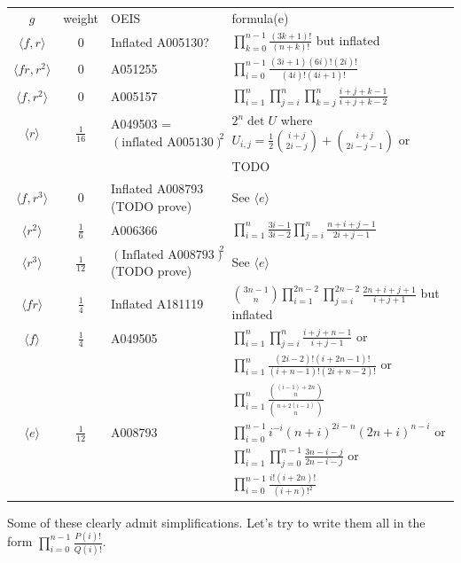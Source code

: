 \documentclass[11pt,a4paper]{article}
\theoremstyle{remark}
\begin{document}
\begin{tabular}{ccll}
$g$                     & weight & OEIS & formula(e) \\
$\langle f,r\rangle$    & $0$ & Inflated A005130? & $\prod_{k=0}^{n-1} \frac{(3k+1)!}{(n+k)!}$ but inflated \\
$\langle fr,r^2\rangle$ & $0$ & A051255 & $\prod_{i=0}^{n-1} \frac{(3i+1)(6i)!(2i)!}{(4i)!(4i+1)!}$ \\
$\langle f,r^2\rangle$  & $0$ & A005157 & $\prod_{i=1}^n \prod_{j=i}^n \prod_{k=j}^n \frac{i+j+k-1}{i+j+k-2}$ \\
$\langle r\rangle$      & $\frac{1}{16}$ & A049503 = $(\textrm{inflated A005130})^2$ & $2^n \det U$ where $U_{i,j} = \frac{1}{2}\binom{i+j}{2i-j} + \binom{i+j}{2i-j-1}$ or \\
	& & & TODO \\
$\langle f,r^3\rangle$  & $0$ & Inflated A008793 (TODO prove) & See $\langle e\rangle$ \\
$\langle r^2\rangle$    & $\frac{1}{6}$ & A006366 & $\prod_{i=1}^n \frac{3i-1}{3i-2} \prod_{j=i}^{n} \frac{n+i+j-1}{2i+j-1}$ \\
$\langle r^3\rangle$    & $\frac{1}{12}$ & $(\textrm{Inflated A008793})^2$ (TODO prove) & See $\langle e\rangle$ \\

$\langle fr\rangle$     & $\frac{1}{4}$ & Inflated A181119 & $\binom{3n-1}{n} \prod_{i=1}^{2n-2} \prod_{j=i}^{2n-2} \frac{2n+i+j+1}{i+j+1}$ but inflated \\

$\langle f\rangle$      & $\frac{1}{4}$ & A049505 & $\prod_{i=1}^n \prod_{j=i}^n \frac{i+j+n-1}{i+j-1}$ or \\
	& & & $\prod_{i=1}^n \frac{ (2i-2)!(i+2n-1)! }{ (i+n-1)!(2i+n-2)! }$ or \\
	& & & $\prod_{i=1}^n \frac{ \binom{(i-1) + 2n}{n} }{ \binom{n + 2(i-1)}{n} }$ \\

$\langle e\rangle$      & $\frac{1}{12}$ & A008793 & $\prod_{i=0}^{n-1} i^{-i}(n+i)^{2i-n}(2n+i)^{n-i}$ or \\
	& & & $\prod_{i=1}^{n} \prod_{j=0}^{n-1} \frac{3n-i-j}{2n-i-j}$ or \\
	& & & $\prod_{i=0}^{n-1} \frac{i!(i+2n)!}{(i+n)!^2}$
\end{tabular}

Some of these clearly admit simplifications. Let's try to write them all in the form $\prod_{i=0}^{n-1} \frac{P(i)!}{Q(i)!}$.
\end{document}
